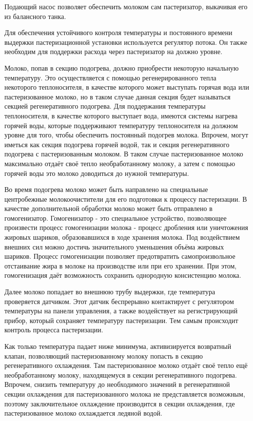 Подающий насос позволяет обеспечить молоком сам пастеризатор, выкачивая его из балансного танка.

Для обеспечения устойчивого контроля температуры и постоянного времени выдержки пастеризационной установки используется регулятор потока. Он также необходим для поддержки расхода через пастеризатор на должно уровне.

Молоко, попав в секцию подогрева, должно приобрести некоторую начальную температуру. Это осуществляется с помощью регенерированного тепла некоторого теплоносителя, в качестве которого может выступать горячая вода или пастеризованное молоко, но в таком случае данная секция будет называться секцией регенеративного подогрева. Для поддержания температуры теплоносителя, в качестве которого выступает вода, имеются системы нагрева горячей воды, которые поддерживают температуру теплоносителя на должном уровне для того, чтобы обеспечить постоянный подогрев молока. Впрочем, могут иметься как секция подогрева горячей водой, так и секция регенеративного подогрева с пастеризованным молоком. В таком случае пастеризованное молоко максимально отдаёт своё тепло необработанному молоку, а затем с помощью горячей воды это молоко доводиться до нужной температуры.

Во время подогрева молоко может быть направлено на специальные центробежные молокоочистители для его подготовки к процессу пастеризации. В качестве дополнительной обработки молоко может быть отправлено в гомогенизатор. Гомогенизатор - это специальное устройство, позволяющее произвести процесс гомогенизации молока - процесс дробления или уничтожения жировых шариков, образовавшихся в ходе хранения молока. Под воздействием внешних сил можно достичь значительного уменьшения объёма жировых шариков. Процесс гомогенизации позволяет предотвратить самопроизвольное отстаивание жира в молоке на производстве или при его хранении. При этом, гомогенизация даёт возможность сохранить однородную консистенцию молока.

Далее молоко попадает во внешнюю трубу выдержки, где температура проверяется датчиком. Этот датчик беспрерывно контактирует с регулятором температуры на панели управления, а также воздействует на регистрирующий прибор, который сохраняет температуру пастеризации. Тем самым происходит контроль процесса пастеризации.

Как только температура падает ниже минимума, активизируется возвратный клапан, позволяющий пастеризованному молоку попасть в секцию регенеративного охлаждения. Там пастеризованное молоко отдаёт своё тепло ещё необработанному молоку, находящемуся в секции регенеративного подогрева. Впрочем, снизить температуру до необходимого значений в регенеративной секции охлаждения для пастеризованного молока не представляется возможным, поэтому заключительное охлаждение производится в секции охлаждения, где пастеризованное молоко охлаждается ледяной водой.


